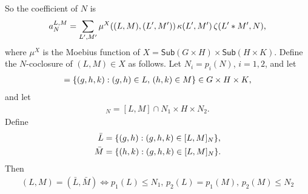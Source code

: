 \documentclass[12pt,a4paper]{amsart}
\newcommand{\Sub}{\mathsf{Sub}}
\begin{document}
So the coefficient of $N$ is
\begin{align*}
  a^{L,M}_N = \sum_{L',M'} \mu^X((L, M), (L', M'))\,  \kappa(L', M') \, \zeta(L' * M', N)\text,
\end{align*}
where $\mu^X$ is the Moebius function of $X = \Sub(G \times H) \times \Sub(H \times K)$.  Define the $N$-coclosure of $(L, M) \in X$ as follows.
Let $N_i = p_i(N)$, $i = 1,2$, and let
\begin{align*}
  [L, M] = \{(g, h, k) : (g, h) \in L,\, (h, k) \in M\} \in G \times H \times K\text,
\end{align*}
and let
\begin{align*}
  [L, M]_N = [L, M] \cap N_1 \times H \times N_2.
\end{align*}
Define
\begin{align*}
  \bar{L} &= \{(g,h) : (g,h,k) \in [L, M]_N\}\text,\\
  \bar{M} &= \{(h,k) : (g,h,k) \in [L, M]_N\}\text.
\end{align*}
Then 
\begin{align*}
  (L, M) = (\bar{L}, \bar{M}) \iff
p_1(L) \leq N_1,\, p_2(L) = p_1(M),\, p_2(M) \leq N_2
\end{align*}
\end{document}
